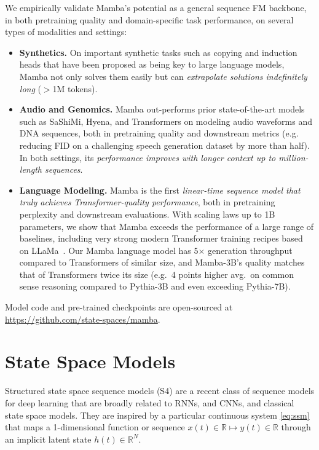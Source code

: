 We empirically validate Mamba's potential as a general sequence FM backbone, in both pretraining quality and domain-specific task performance, on several types of modalities and settings:

\begin{itemize}[leftmargin=*,itemsep=0pt,topsep=0pt]
  \item \textbf{Synthetics.} On important synthetic tasks such as copying and induction heads that have been proposed as being key to large language models, Mamba not only solves them easily but can \emph{extrapolate solutions indefinitely long} ($>$1M tokens).
  \item \textbf{Audio and Genomics.} Mamba out-performs prior state-of-the-art models such as SaShiMi, Hyena, and Transformers on modeling audio waveforms and DNA sequences, both in pretraining quality and downstream metrics (e.g. reducing FID on a challenging speech generation dataset by more than half). In both settings, its \emph{performance improves with longer context up to million-length sequences}.
  \item \textbf{Language Modeling.} Mamba is the first \emph{linear-time sequence model that truly achieves Transformer-quality performance}, both in pretraining perplexity and downstream evaluations. With scaling laws up to 1B parameters, we show that Mamba exceeds the performance of a large range of baselines, including very strong modern Transformer training recipes based on LLaMa~\citep{touvron2023llama}.
    Our Mamba language model has 5$\times$ generation throughput compared to Transformers of similar size, and Mamba-3B's quality matches that of Transformers twice its size (e.g.\ 4 points higher avg.\ on common sense reasoning compared to Pythia-3B and even exceeding Pythia-7B).
\end{itemize}

Model code and pre-trained checkpoints are open-sourced at \url{https://github.com/state-spaces/mamba}.

\section{State Space Models}
\label{sec:background}

Structured state space sequence models (S4) are a recent class of sequence models for deep learning that are broadly related to RNNs, and CNNs, and classical state space models. They are inspired by a particular continuous system \eqref{eq:ssm}
that maps a 1-dimensional function or sequence $x(t) \in \mathbb{R} \mapsto y(t) \in \mathbb{R}$ through an implicit latent state \( h(t) \in \mathbb{R}^N \). 

